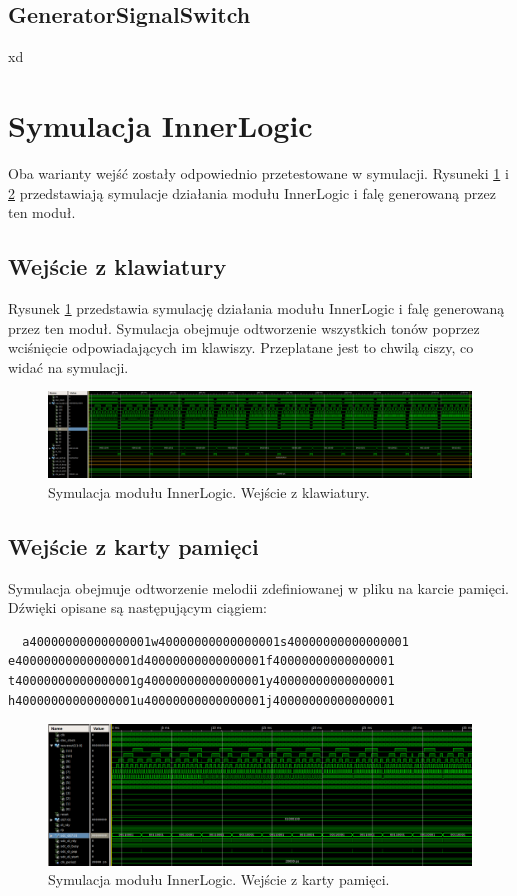 \documentclass[12pt]{article}
\begin{document}
\subsection{GeneratorSignalSwitch}
xd

\section{Symulacja InnerLogic}
Oba warianty wejść zostały odpowiednio przetestowane w symulacji. Rysuneki \ref{sim:kb} i \ref{sim:sd} przedstawiają symulacje działania modułu InnerLogic i falę generowaną przez ten moduł.
\subsection{Wejście z klawiatury}
Rysunek \ref{sim:kb} przedstawia symulację działania modułu InnerLogic i falę generowaną przez ten moduł. Symulacja obejmuje odtworzenie wszystkich tonów poprzez wciśnięcie odpowiadających im klawiszy. Przeplatane jest to chwilą ciszy, co widać na symulacji.
\begin{figure}[h]
  \centering
  \includegraphics[decodearray={1 0 1 0 1 0}, width=\linewidth]{images/inner_sim_kb}
  \caption{Symulacja modułu InnerLogic. Wejście z klawiatury.}
  \label{sim:kb}
\end{figure}

\subsection{Wejście z karty pamięci}
 Symulacja obejmuje odtworzenie melodii zdefiniowanej w pliku na karcie pamięci. Dźwięki opisane są następującym ciągiem:
 \begin{lstlisting}
  a40000000000000001w40000000000000001s40000000000000001 e40000000000000001d40000000000000001f40000000000000001 t40000000000000001g40000000000000001y40000000000000001 h40000000000000001u40000000000000001j40000000000000001
 \end{lstlisting}
\begin{figure}[h]
  \centering
  \includegraphics[decodearray={1 0 1 0 1 0}, width=\linewidth]{images/inner_sim_sd}
  \caption{Symulacja modułu InnerLogic. Wejście z karty pamięci.}
  \label{sim:sd}
\end{figure}
\end{document}
